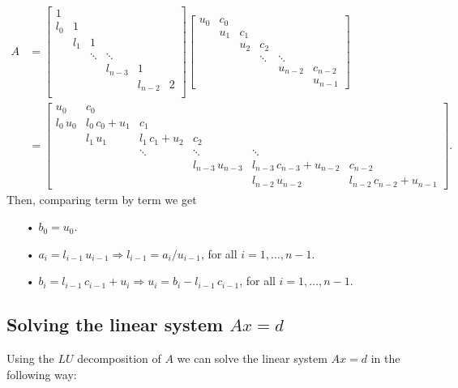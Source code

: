 \documentclass[11pt,a4paper]{report}
\begin{document}
\begin{equation*}
\begin{aligned}
A &= 
\begin{bmatrix}
1\\
l_0 & 1\\
& l_1 & 1\\
& & \ddots & \ddots\\
& & & l_{n-3} & 1\\
& & & & l_{n-2} & 2\\
\end{bmatrix}
\begin{bmatrix}
u_0 & c_0\\
& u_1 & c_1\\
& & u_2 & c_2\\
& & & \ddots & \ddots\\
& & & & u_{n-2} & c_{n-2}\\
& & & & & u_{n-1}
\end{bmatrix}\\
&= 
\begin{bmatrix}
u_0 & c_0\\
l_0\,u_0 & l_0\,c_0+u_1 & c_1\\
& l_1\,u_1 & l_1\,c_1 + u_2 & c_2\\
& &  \ddots & \ddots & \ddots\\
& & & l_{n-3}\,u_{n-3} & l_{n-3}\,c_{n-3}+u_{n-2} & c_{n-2}\\
& & & & l_{n-2}\,u_{n-2} & l_{n-2}\,c_{n-2} + u_{n-1}
\end{bmatrix}.
\end{aligned}
\end{equation*}
Then, comparing term by term we get
\begin{itemize}
\item[•] $b_0=u_0$.
\item[•] $a_i=l_{i-1}\,u_{i-1}\Rightarrow l_{i-1}=a_i/u_{i-1}$, for all $i=1,\dots,n-1$.
\item[•] $b_i=l_{i-1}\,c_{i-1}+u_i\Rightarrow u_i=b_i-l_{i-1}\,c_{i-1}$, for all $i=1,\dots,n-1$.
\end{itemize}

\subsection*{Solving the linear system $Ax = d$}
Using the $LU$ decomposition of $A$ we can solve the linear system $Ax = d$ in the following way:
\end{document}
